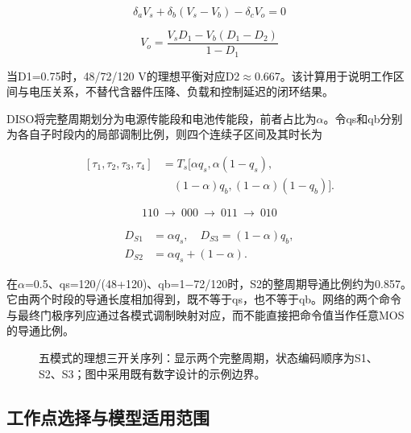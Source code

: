 \documentclass[UTF8,fontset=fandol,a4paper,twocolumn,10pt]{ctexart}
\begin{document}
\begin{equation}\delta_a V_s+\delta_b(V_s-V_b)-\delta_cV_o=0\label{eq:7}\end{equation}

\begin{equation}V_o=\frac{V_sD_1-V_b(D_1-D_2)}{1-D_1}\label{eq:8}\end{equation}

当D1=0.75时，48/72/120 V的理想平衡对应D2$\approx$0.667。该计算用于说明工作区间与电压关系，不替代含器件压降、负载和控制延迟的闭环结果。

DISO将完整周期划分为电源传能段和电池传能段，前者占比为$\alpha$。令qs和qb分别为各自子时段内的局部调制比例，则四个连续子区间及其时长为

\begin{equation}\begin{aligned}[\tau_1,\tau_2,\tau_3,\tau_4]&=T_s[\alpha q_s,\alpha(1-q_s),\\ &\quad(1-\alpha)q_b,(1-\alpha)(1-q_b)].\end{aligned}\label{eq:9}\end{equation}

\begin{equation}110\ \longrightarrow\ 000\ \longrightarrow\ 011\ \longrightarrow\ 010\label{eq:10}\end{equation}

\begin{equation}\begin{aligned}D_{S1}&=\alpha q_s,\quad D_{S3}=(1-\alpha)q_b,\\ D_{S2}&=\alpha q_s+(1-\alpha).\end{aligned}\label{eq:11}\end{equation}

在$\alpha$=0.5、qs=120/(48+120)、qb=1−72/120时，S2的整周期导通比例约为0.857。它由两个时段的导通长度相加得到，既不等于qs，也不等于qb。网络的两个命令与最终门极序列应通过各模式调制映射对应，而不能直接把命令值当作任意MOS的导通比例。

\begin{figure}[!tp]\centering\resizebox{.98\textwidth}{!}{}
\caption{五模式的理想三开关序列：显示两个完整周期，状态编码顺序为S1、S2、S3；图中采用既有数字设计的示例边界。}\label{fig:3}\end{figure}


\subsection{工作点选择与模型适用范围}
\end{document}
